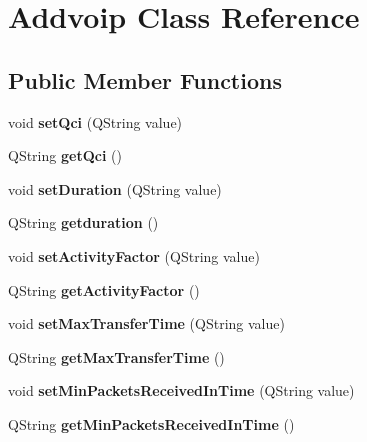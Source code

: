 \hypertarget{class_addvoip}{}\section{Addvoip Class Reference}
\label{class_addvoip}
\subsection*{Public Member Functions}
\begin{DoxyCompactItemize}
\item 
void {\bfseries set\+Qci} (Q\+String value)\hypertarget{class_addvoip_a0643047c81f40907d065992c8066b3b8}{}\label{class_addvoip_a0643047c81f40907d065992c8066b3b8}

\item 
Q\+String {\bfseries get\+Qci} ()\hypertarget{class_addvoip_a2bca71813ea5f7fc140cc42b5ee5c137}{}\label{class_addvoip_a2bca71813ea5f7fc140cc42b5ee5c137}

\item 
void {\bfseries set\+Duration} (Q\+String value)\hypertarget{class_addvoip_a5977051e0a067af633abf8481de80c10}{}\label{class_addvoip_a5977051e0a067af633abf8481de80c10}

\item 
Q\+String {\bfseries getduration} ()\hypertarget{class_addvoip_a43dc2235f275e3a813617b1a3256533e}{}\label{class_addvoip_a43dc2235f275e3a813617b1a3256533e}

\item 
void {\bfseries set\+Activity\+Factor} (Q\+String value)\hypertarget{class_addvoip_a60dc2494afad5419eadb701a42610419}{}\label{class_addvoip_a60dc2494afad5419eadb701a42610419}

\item 
Q\+String {\bfseries get\+Activity\+Factor} ()\hypertarget{class_addvoip_a595821f64ca873b405a2c8f4915e8309}{}\label{class_addvoip_a595821f64ca873b405a2c8f4915e8309}

\item 
void {\bfseries set\+Max\+Transfer\+Time} (Q\+String value)\hypertarget{class_addvoip_a4cf014cef04cdff47ed49ed6cf126855}{}\label{class_addvoip_a4cf014cef04cdff47ed49ed6cf126855}

\item 
Q\+String {\bfseries get\+Max\+Transfer\+Time} ()\hypertarget{class_addvoip_af6c0b475fdf62c7ef8c8a238e1a9f49a}{}\label{class_addvoip_af6c0b475fdf62c7ef8c8a238e1a9f49a}

\item 
void {\bfseries set\+Min\+Packets\+Received\+In\+Time} (Q\+String value)\hypertarget{class_addvoip_ab8b61130d1f6c4e692ab64b98f6ecc78}{}\label{class_addvoip_ab8b61130d1f6c4e692ab64b98f6ecc78}

\item 
Q\+String {\bfseries get\+Min\+Packets\+Received\+In\+Time} ()\hypertarget{class_addvoip_a8c52e564bafff0dbf278868e20b9003c}{}\label{class_addvoip_a8c52e564bafff0dbf278868e20b9003c}

\end{DoxyCompactItemize}


